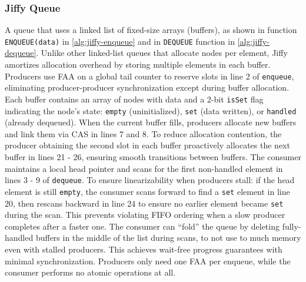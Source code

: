 \subsubsection{Jiffy Queue}
A queue that uses a linked list of fixed-size arrays (buffers), as shown in function \newline \texttt{ENQUEUE(data)} in \cref{alg:jiffy-enqueue} and in \texttt{DEQUEUE} function in \cref{alg:jiffy-dequeue}. Unlike other linked-list queues that allocate nodes per element, Jiffy amortizes allocation overhead by storing multiple elements in each buffer. Producers use \ac{FAA} on a global tail counter to reserve slots in line 2 of \texttt{enqueue}, eliminating producer-producer synchronization except during buffer allocation. Each buffer contains an array of nodes with data and a 2-bit \texttt{isSet} flag indicating the node's state: \texttt{empty} (uninitialized), \texttt{set} (data written), or \texttt{handled} (already dequeued). When the current buffer fills, producers allocate new buffers and link them via \ac{CAS} in lines 7 and 8. To reduce allocation contention, the producer obtaining the second slot in each buffer proactively allocates the next buffer in lines 21 - 26, ensuring smooth transitions between buffers. The consumer maintains a local head pointer and scans for the first non-handled element in lines 3 - 9 of \texttt{dequeue}. To ensure linearizability when producers stall: if the head element is still \texttt{empty}, the consumer scans forward to find a \texttt{set} element in line 20, then rescans backward in line 24 to ensure no earlier element became \texttt{set} during the scan. This prevents violating FIFO ordering when a slow producer completes after a faster one. The consumer can ``fold'' the queue by deleting fully-handled buffers in the middle of the list during scans, to not use to much memory even with stalled producers. This achieves wait-free progress guarantees with minimal synchronization. Producers only need one \ac{FAA} per enqueue, while the consumer performs no atomic operations at all. \cite{jiffy}

